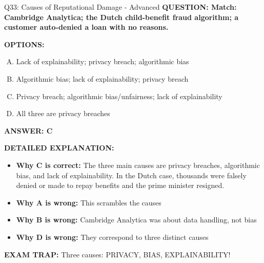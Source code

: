 \documentclass[8pt]{beamer}
\begin{document}
\begin{frame}[shrink=6]{Q33: Causes of Reputational Damage - Advanced}
\fontsize{6.5}{7.5}\selectfont
\textbf{QUESTION: Match: Cambridge Analytica; the Dutch child-benefit fraud algorithm; a customer auto-denied a loan with no reasons.}

\vspace{0.1cm}
\textbf{OPTIONS:}
\begin{enumerate}[A.]
\item Lack of explainability; privacy breach; algorithmic bias
\item Algorithmic bias; lack of explainability; privacy breach
\item Privacy breach; algorithmic bias/unfairness; lack of explainability
\item All three are privacy breaches
\end{enumerate}

\vspace{0.1cm}
\textcolor{myblue}{\textbf{ANSWER: C}}

\vspace{0.1cm}
\textbf{DETAILED EXPLANATION:}
\begin{itemize}
\item \textbf{Why C is correct:} The three main causes are privacy breaches, algorithmic bias, and lack of explainability. In the Dutch case, thousands were falsely denied or made to repay benefits and the prime minister resigned.
\item \textbf{Why A is wrong:} This scrambles the causes
\item \textbf{Why B is wrong:} Cambridge Analytica was about data handling, not bias
\item \textbf{Why D is wrong:} They correspond to three distinct causes
\end{itemize}

\textcolor{myred}{\textbf{EXAM TRAP:}} Three causes: PRIVACY, BIAS, EXPLAINABILITY!
\end{frame}
\end{document}
